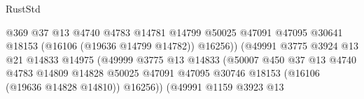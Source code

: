 \begin{lexlean}{RustStd}
\begin{coremodule}
                                                    @369
                                                    @37
                                                    @13
                                                    @4740
                                                    @4783
                                                    @14781
                                                    @14799
                                                    @50025
                                                    @47091
                                                    @47095
                                                    @30641
                                                    @18153
                                                    (@16106 (@19636 @14799 @14782))
                                                    @16256))
                                                (@49991
                                                  @3775
                                                  @3924
                                                  @13
                                                  @21
                                                  @14833
                                                  @14975
                                                  (@49999
                                                    @3775
                                                    @13
                                                    @14833
                                                    (@50007
                                                      @450
                                                      @37
                                                      @13
                                                      @4740
                                                      @4783
                                                      @14809
                                                      @14828
                                                      @50025
                                                      @47091
                                                      @47095
                                                      @30746
                                                      @18153
                                                      (@16106 (@19636 @14828 @14810))
                                                      @16256))
                                                  (@49991
                                                    @1159
                                                    @3923
                                                    @13

\end{coremodule}
\end{lexlean}
